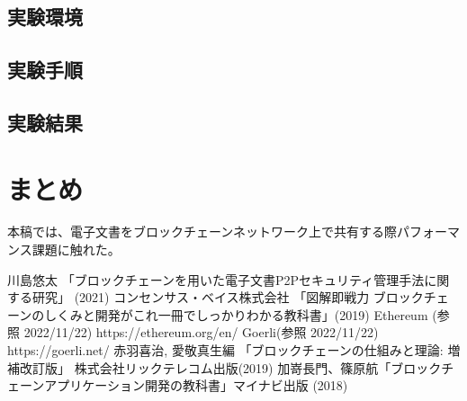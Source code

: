 \documentclass[10.5pt,a4paper,twocolumn]{jsarticle}
\begin{document}
\subsection{実験環境}
\subsection{実験手順}
\subsection{実験結果}

\section{まとめ}
本稿では、電子文書をブロックチェーンネットワーク上で共有する際パフォーマンス課題に触れた。


\begin{thebibliography}{99}
川島悠太 「ブロックチェーンを用いた電子文書P2Pセキュリティ管理手法に関する研究」
(2021)
コンセンサス・ベイス株式会社 「図解即戦力 ブロックチェーンのしくみと開発がこれ一冊でしっかりわかる教科書」(2019)
Ethereum (参照 2022/11/22) https://ethereum.org/en/
Goerli(参照 2022/11/22) https://goerli.net/
赤羽喜治, 愛敬真生編 「ブロックチェーンの仕組みと理論: 増補改訂版」 株式会社リックテレコム出版(2019)
加嵜長門、篠原航「ブロックチェーンアプリケーション開発の教科書」マイナビ出版 (2018)
\end{thebibliography}
\end{document}
